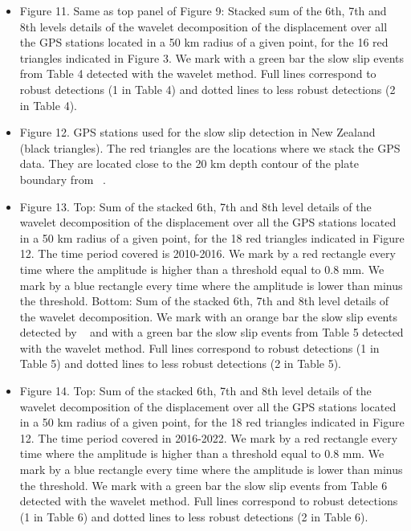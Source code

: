 \documentclass{article}
\begin{document}
\begin{itemize}
\item Figure 11. Same as top panel of Figure 9: Stacked sum of the 6th, 7th and 8th levels details of the wavelet decomposition of the displacement over all the GPS stations located in a 50 km radius of a given point, for the 16 red triangles indicated in Figure 3. We mark with a green bar the slow slip events from Table 4 detected with the wavelet method. Full lines correspond to robust detections (1 in Table 4) and dotted lines to less robust detections (2 in Table 4).

\item Figure 12. GPS stations used for the slow slip detection in New Zealand (black triangles). The red triangles are the locations where we stack the GPS data. They are located close to the 20 km depth contour of the plate boundary from ~\citet{WIL_2013}.

\item Figure 13. Top: Sum of the stacked 6th, 7th and 8th level details of the wavelet decomposition of the displacement over all the GPS stations located in a 50 km radius of a given point, for the 18 red triangles indicated in Figure 12. The time period covered is 2010-2016. We mark by a red rectangle every time where the amplitude is higher than a threshold equal to 0.8 mm. We mark by a blue rectangle every time where the amplitude is lower than minus the threshold. Bottom: Sum of the stacked 6th, 7th and 8th level details of the wavelet decomposition. We mark with an orange bar the slow slip events detected by ~\citet{TOD_2016} and with a green bar the slow slip events from Table 5 detected with the wavelet method. Full lines correspond to robust detections (1 in Table 5) and dotted lines to less robust detections (2 in Table 5).

\item Figure 14. Top: Sum of the stacked 6th, 7th and 8th level details of the wavelet decomposition of the displacement over all the GPS stations located in a 50 km radius of a given point, for the 18 red triangles indicated in Figure 12. The time period covered in 2016-2022. We mark by a red rectangle every time where the amplitude is higher than a threshold equal to 0.8 mm. We mark by a blue rectangle every time where the amplitude is lower than minus the threshold. We mark with a green bar the slow slip events from Table 6 detected with the wavelet method. Full lines correspond to robust detections (1 in Table 6) and dotted lines to less robust detections (2 in Table 6).

\end {itemize}
\end{document}
